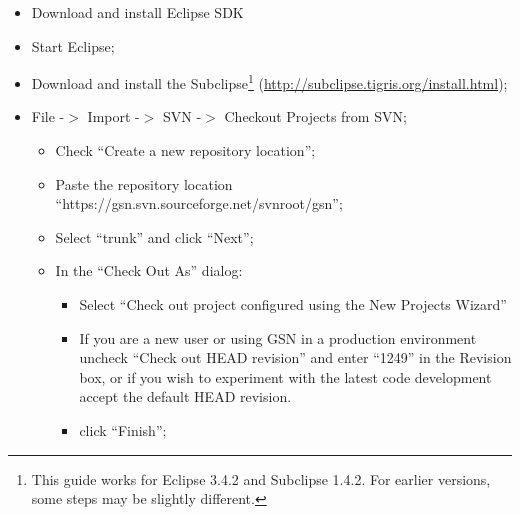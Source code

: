 \begin{itemize}
	\item Download and install Eclipse SDK
	\item Start Eclipse;
	\item Download and install the Subclipse\footnote{This guide works for Eclipse 3.4.2 and Subclipse 1.4.2.  For earlier versions, some steps may be slightly different.}
(\url{http://subclipse.tigris.org/install.html});
	\item File -\begin{math}>\end{math} Import -\begin{math}>\end{math} SVN
-\begin{math}>\end{math} Checkout Projects from SVN;
\begin{itemize}
	\item Check \textquotedblleft{}Create a new repository
location\textquotedblright{};
	\item Paste the repository location
\textquotedblleft{}https://gsn.svn.sourceforge.net/svnroot/gsn\textquotedblright{};
	\item Select \textquotedblleft{}trunk\textquotedblright{} and click
\textquotedblleft{}Next\textquotedblright{};
	\item In the \textquotedblleft{}Check Out As\textquotedblright{} dialog:

\begin{itemize}
	\item Select \textquotedblleft{}Check out project configured using the New
Projects Wizard\textquotedblright{}
\item If you are a new user or using GSN in a production environment uncheck \textquotedblleft{}Check out HEAD revision\textquotedblright{} and enter \textquotedblleft1249\textquotedblright{} in the Revision box, or if you wish to experiment with the latest code development accept the default HEAD revision.
\item click
\textquotedblleft{}Finish\textquotedblright{};

\end{itemize}


\end{itemize}
\end{itemize}
